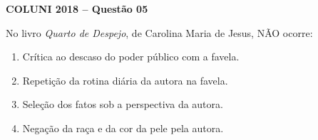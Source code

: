 \textbf{COLUNI 2018 -- Questão 05}\par\medskip No livro \textit{Quarto de Despejo}, de Carolina Maria de Jesus, NÃO ocorre:\begin{enumerate}
\item Crítica ao descaso do poder público com a favela.
\item Repetição da rotina diária da autora na favela.
\item Seleção dos fatos sob a perspectiva da autora.
\item Negação da raça e da cor da pele pela autora.\end{enumerate}
